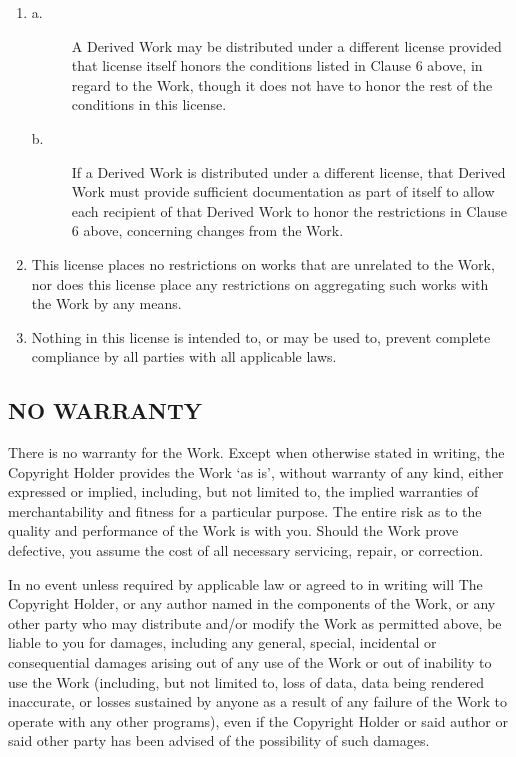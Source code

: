 \begin{enumerate}
\item
\begin{description}
    \item [a.] A Derived Work may be distributed under a different license
       provided that license itself honors the conditions listed in
       Clause 6 above, in regard to the Work, though it does not have
       to honor the rest of the conditions in this license.
      
    \item [b.] If a Derived Work is distributed under a different license, that
       Derived Work must provide sufficient documentation as part of
       itself to allow each recipient of that Derived Work to honor the 
       restrictions in Clause 6 above, concerning changes from the Work.
\end{description}
\item This license places no restrictions on works that are unrelated to
the Work, nor does this license place any restrictions on aggregating
such works with the Work by any means.

\item Nothing in this license is intended to, or may be used to, prevent
complete compliance by all parties with all applicable laws.
\end{enumerate}

\subsection{NO WARRANTY}

There is no warranty for the Work.  Except when otherwise stated in
writing, the Copyright Holder provides the Work `as is', without
warranty of any kind, either expressed or implied, including, but not
limited to, the implied warranties of merchantability and fitness for a
particular purpose.  The entire risk as to the quality and performance
of the Work is with you.  Should the Work prove defective, you assume
the cost of all necessary servicing, repair, or correction.

In no event unless required by applicable law or agreed to in writing
will The Copyright Holder, or any author named in the components of the
Work, or any other party who may distribute and/or modify the Work as
permitted above, be liable to you for damages, including any general,
special, incidental or consequential damages arising out of any use of
the Work or out of inability to use the Work (including, but not limited
to, loss of data, data being rendered inaccurate, or losses sustained by
anyone as a result of any failure of the Work to operate with any other
programs), even if the Copyright Holder or said author or said other
party has been advised of the possibility of such damages.


